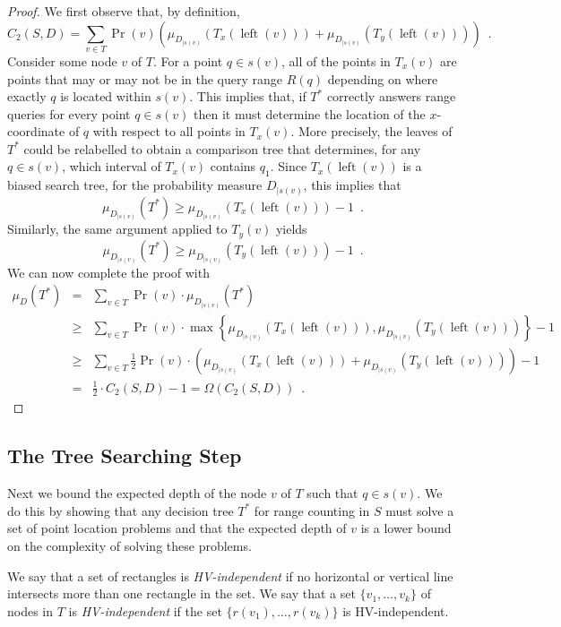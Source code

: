 \documentclass[lotsofwhite,charterfonts]{patmorin}
\DeclareMathOperator{\lft}{left}
\begin{document}
\begin{proof}
We first observe that, by definition,
\[
  C_2(S,D) =  \sum_{v\in T} 
              \Pr(v)\left( \mu_{D_{\mid s(v)}}(T_x(\lft(v)))
                               +  \mu_{D_{\mid s(v)}}(T_y(\lft(v))) \right)
           \enspace .
\]
Consider some node $v$ of $T$.  For a point $q\in s(v)$, all of the
points in $T_x(v)$ are points that may or may not be in the query
range $R(q)$ depending on where exactly $q$ is located within $s(v)$.
This implies that, if $T^*$ correctly answers range queries for every
point $q\in s(v)$ then it must determine the location of the
$x$-coordinate of $q$ with respect to all points in $T_x(v)$.  More
precisely, the leaves of $T^*$ could be relabelled to obtain a
comparison tree that determines, for any $q\in s(v)$, which interval
of $T_x(v)$ contains $q_1$.  Since $T_x(\lft(v))$ is a biased search tree,
for the probability measure $D_{\mid s(v)}$, this implies that
\[
  \mu_{D_{\mid s(v)}}(T^*) \ge \mu_{D_{\mid s(v)}}(T_x(\lft(v))) - 1\enspace .
\]
Similarly, the same argument applied to $T_y(v)$ yields 
\[
  \mu_{D_{\mid s(v)}}(T^*) \ge \mu_{D_{\mid s(v)}}(T_y(\lft(v))) - 1\enspace .
\]
We can now complete the proof with
\begin{eqnarray*}
\mu_D(T^*) 
 & = & \sum_{v\in T} \Pr(v)\cdot\mu_{D_{\mid s(v)}}(T^*) \\
 & \ge & \sum_{v\in T}
	\Pr(v) \cdot\max\left\{\mu_{D_{\mid s(v)}}(T_x(\lft(v))), 
		       \mu_{D_{\mid s(v)}}(T_y(\lft(v)))\right\} - 1 \\
 & \ge & \sum_{v\in T}
	\frac{1}{2}\Pr(v)\cdot\left( \mu_{D_{\mid s(v)}}(T_x(\lft(v)))
                             +  \mu_{D_{\mid s(v)}}(T_y(\lft(v))) \right) - 1 \\
 & = & \frac{1}{2}\cdot C_2(S,D) - 1 = \Omega(C_2(S,D)) \enspace .
\end{eqnarray*}
\end{proof}

\subsection{The Tree Searching Step}

Next we bound the expected depth of the node $v$ of $T$ such that
$q\in s(v)$.  We do this by showing that any decision tree $T^*$ for
range counting in $S$ must solve a set of point location problems and
that the expected depth of $v$ is a lower bound on the complexity of
solving these problems.

We say that a set of rectangles is \emph{HV-independent} if no
horizontal or vertical line intersects more than one rectangle in the
set.  We say that a set $\{v_1,\ldots,v_k\}$ of nodes in $T$ is
\emph{HV-independent} if the set $\{r(v_1),\ldots,r(v_k)\}$ is
HV-independent.
\end{document}
